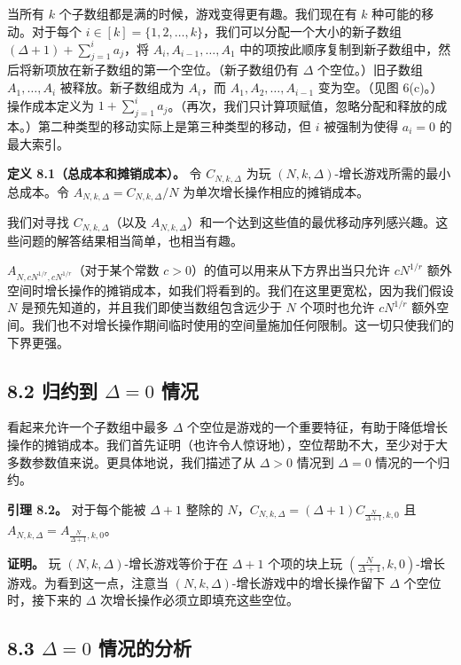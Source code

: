 \documentclass[12pt,a4paper]{ctexart}
\theoremstyle{remark}
\begin{document}
当所有 $k$ 个子数组都是满的时候，游戏变得更有趣。我们现在有 $k$ 种可能的移动。对于每个 $i\in[k]=\{1,2,\ldots,k\}$，我们可以分配一个大小的新子数组 $(\Delta+1)+\sum_{j=1}^{i}a_j$，将 $A_i,A_{i-1},\ldots,A_1$ 中的项按此顺序复制到新子数组中，然后将新项放在新子数组的第一个空位。（新子数组仍有 $\Delta$ 个空位。）旧子数组 $A_1,\ldots,A_i$ 被释放。新子数组成为 $A_i$，而 $A_1,A_2,\ldots,A_{i-1}$ 变为空。（见图 6(c)。）操作成本定义为 $1+\sum_{j=1}^{i}a_j$。（再次，我们只计算项赋值，忽略分配和释放的成本。）第二种类型的移动实际上是第三种类型的移动，但 $i$ 被强制为使得 $a_i=0$ 的最大索引。

\textbf{定义 8.1（总成本和摊销成本）。} 令 $C_{N,k,\Delta}$ 为玩 $(N,k,\Delta)$-增长游戏所需的最小总成本。令 $A_{N,k,\Delta}=C_{N,k,\Delta}/N$ 为单次增长操作相应的摊销成本。

我们对寻找 $C_{N,k,\Delta}$（以及 $A_{N,k,\Delta}$）和一个达到这些值的最优移动序列感兴趣。这些问题的解答结果相当简单，也相当有趣。

$A_{N,cN^{1/r},cN^{1/r}}$（对于某个常数 $c>0$）的值可以用来从下方界出当只允许 $cN^{1/r}$ 额外空间时增长操作的摊销成本，如我们将看到的。我们在这里更宽松，因为我们假设 $N$ 是预先知道的，并且我们即使当数组包含远少于 $N$ 个项时也允许 $cN^{1/r}$ 额外空间。我们也不对增长操作期间临时使用的空间量施加任何限制。这一切只使我们的下界更强。

\subsection{8.2 归约到 $\Delta=0$ 情况}

看起来允许一个子数组中最多 $\Delta$ 个空位是游戏的一个重要特征，有助于降低增长操作的摊销成本。我们首先证明（也许令人惊讶地），空位帮助不大，至少对于大多数参数值来说。更具体地说，我们描述了从 $\Delta>0$ 情况到 $\Delta=0$ 情况的一个归约。

\textbf{引理 8.2。} 对于每个能被 $\Delta+1$ 整除的 $N$，$C_{N,k,\Delta}=(\Delta+1)C_{\frac{N}{\Delta+1},k,0}$ 且 $A_{N,k,\Delta}=A_{\frac{N}{\Delta+1},k,0}$。

\textbf{证明。} 玩 $(N,k,\Delta)$-增长游戏等价于在 $\Delta+1$ 个项的块上玩 $(\frac{N}{\Delta+1},k,0)$-增长游戏。为看到这一点，注意当 $(N,k,\Delta)$-增长游戏中的增长操作留下 $\Delta$ 个空位时，接下来的 $\Delta$ 次增长操作必须立即填充这些空位。

\subsection{8.3 $\Delta=0$ 情况的分析}
\end{document}
